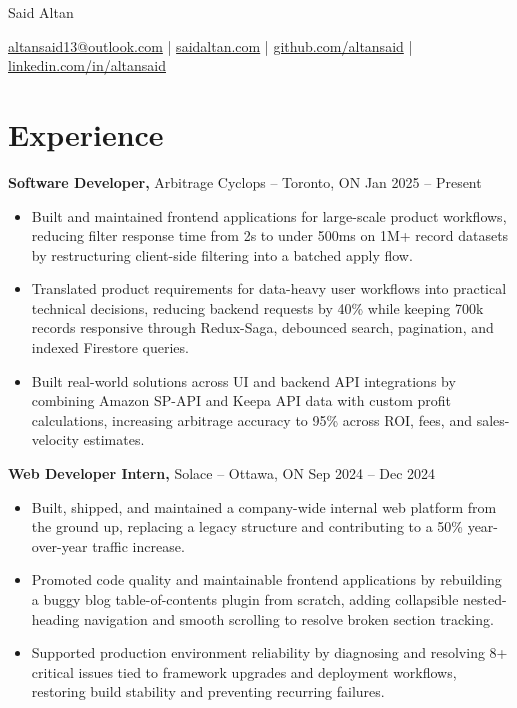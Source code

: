 \documentclass[11pt]{article}       %
\begin{document}
\centerline{\Huge Said Altan}

\vspace{10pt}

\centerline{\href{mailto:altansaid13@outlook.com}{altansaid13@outlook.com} | \href{https://saidaltan.com}{saidaltan.com} | \href{https://github.com/altansaid}{github.com/altansaid} | \href{https://www.linkedin.com/in/altansaid}{linkedin.com/in/altansaid}}


\vspace{5pt}
\section*{Experience}
\textbf{Software Developer,} {Arbitrage Cyclops} -- Toronto, ON \hfill Jan 2025 -- Present \\
\vspace{-9pt}
\begin{itemize}
  \item Built and maintained frontend applications for large-scale product workflows, reducing filter response time from 2s to under 500ms on 1M+ record datasets by restructuring client-side filtering into a batched apply flow.
  \item Translated product requirements for data-heavy user workflows into practical technical decisions, reducing backend requests by 40\% while keeping 700k records responsive through Redux-Saga, debounced search, pagination, and indexed Firestore queries.
  \item Built real-world solutions across UI and backend API integrations by combining Amazon SP-API and Keepa API data with custom profit calculations, increasing arbitrage accuracy to 95\% across ROI, fees, and sales-velocity estimates.
\end{itemize}

\textbf{Web Developer Intern,} {Solace} -- Ottawa, ON \hfill Sep 2024 -- Dec 2024 \\
\vspace{-9pt}
\begin{itemize}
  \item Built, shipped, and maintained a company-wide internal web platform from the ground up, replacing a legacy structure and contributing to a 50\% year-over-year traffic increase.
  \item Promoted code quality and maintainable frontend applications by rebuilding a buggy blog table-of-contents plugin from scratch, adding collapsible nested-heading navigation and smooth scrolling to resolve broken section tracking.
  \item Supported production environment reliability by diagnosing and resolving 8+ critical issues tied to framework upgrades and deployment workflows, restoring build stability and preventing recurring failures.
\end{itemize}
\end{document}
